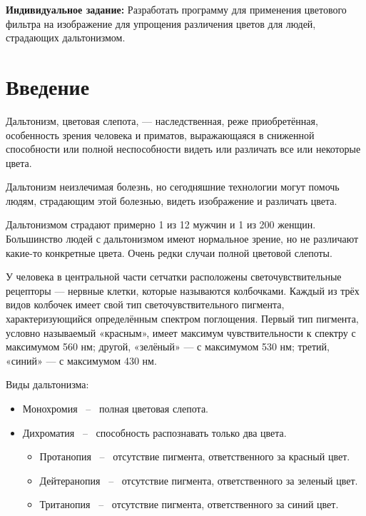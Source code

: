 \documentclass[a4paper,14pt, unknownkeysallowed]{extreport}
\begin{document}
    \thispagestyle{empty}
    \textbf{Индивидуальное задание:}
    \newline
    Разработать программу для применения цветового фильтра на изображение для упрощения различения цветов для людей, страдающих дальтонизмом.

    \pagebreak
    \tableofcontents

    \chapter*{Введение}

    Дальтонизм, цветовая слепота, — наследственная, реже приобретённая, особенность зрения человека и приматов, выражающаяся в сниженной способности или полной неспособности видеть или различать все или некоторые цвета.

    Дальтонизм неизлечимая болезнь, но сегодняшние технологии могут помочь людям, страдающим этой болезнью, видеть изображение и различать цвета.

    Дальтонизмом страдают примерно 1 из 12 мужчин и 1 из 200 женщин. Большинство людей с дальтонизмом имеют нормальное зрение, но не различают какие-то конкретные цвета. Очень редки случаи полной цветовой слепоты.

    У человека в центральной части сетчатки расположены светочувствительные рецепторы — нервные клетки, которые называются колбочками. Каждый из трёх видов колбочек имеет свой тип светочувствительного пигмента, характеризующийся определённым спектром поглощения. Первый тип пигмента, условно называемый «красным», имеет максимум чувствительности к спектру с максимумом 560 нм; другой, «зелёный» — с максимумом 530 нм; третий, «синий» — с максимумом 430 нм.

    Виды дальтонизма:

    \begin{itemize}
        \item Монохромия ~--~ полная цветовая слепота.
        \item Дихроматия ~--~ способность распознавать только два цвета.
        \begin{itemize}
            \item Протанопия ~--~ отсутствие пигмента, ответственного за красный цвет.
            \item Дейтеранопия ~--~ отсутствие пигмента, ответственного за зеленый цвет.
            \item Тританопия ~--~ отсутствие пигмента, ответственного за синий цвет.
        \end{itemize}
    \end{itemize}
\end{document}
